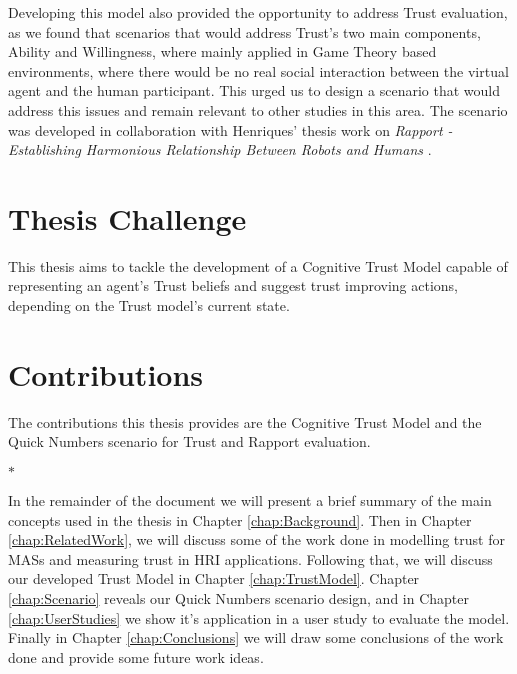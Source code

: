 Developing this model also provided the opportunity to address Trust evaluation, as we found that scenarios that would address Trust's two main components, Ability and Willingness, where mainly applied in Game Theory based environments, where there would be no real social interaction between the virtual agent and the human participant. This urged us to design a scenario that would address this issues and remain relevant to other studies in this area. The scenario was developed in collaboration with Henriques' thesis work on \textit{Rapport - Establishing Harmonious Relationship Between Robots and Humans} \cite{Henriques2016}.


\section{Thesis Challenge}
This thesis aims to tackle the development of a Cognitive Trust Model capable of representing an agent's Trust beliefs and suggest trust improving actions, depending on the Trust model's current state.


\section{Contributions}
The contributions this thesis provides are the Cognitive Trust Model and the Quick Numbers scenario for Trust and Rapport evaluation.
\begin{center}
    $\ast$
\end{center}
In the remainder of the document we will present a brief summary of the main concepts used in the thesis in Chapter \ref{chap:Background}. Then in Chapter \ref{chap:RelatedWork}, we will discuss some of the work done in modelling trust for \acp{MAS} and measuring trust in \ac{HRI} applications. Following that, we will discuss our developed Trust Model in Chapter \ref{chap:TrustModel}. Chapter \ref{chap:Scenario} reveals our Quick Numbers scenario design, and in Chapter \ref{chap:UserStudies} we show it's application in a user study to evaluate the model. Finally in Chapter \ref{chap:Conclusions} we will draw some conclusions of the work done and provide some future work ideas.